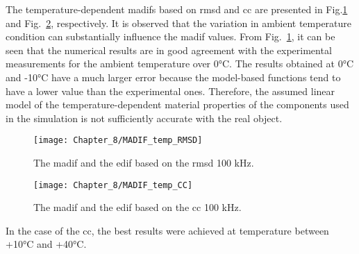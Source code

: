 The temperature-dependent \acp{madif} based on \ac{rmsd} and \ac{cc} are presented in Fig.\ref{fig:madif_temp_rmsd} and Fig.~\ref{fig:madif_temp_cc}, respectively.
It is observed that the variation in ambient temperature condition can substantially influence the \ac{madif} values.
From Fig.~\ref{fig:madif_temp_rmsd}, it can be seen that the numerical results are in good agreement with the experimental measurements for the ambient temperature over 0\unit{\degreeCelsius}.
The results obtained at 0\unit{\degreeCelsius} and -10\unit{\degreeCelsius} have a much larger error because the model-based functions tend to have a lower value than the experimental ones.
Therefore, the assumed linear model of the temperature-dependent material properties of the components used in the simulation is not sufficiently accurate with the real object.
\begin{figure}[!tbh]
	\begin{center}
		\texttt{[image: Chapter\_8/MADIF\_temp\_RMSD]}
	\end{center}
	\caption{The \acf{madif} and the \acf{edif} based on the \acf{rmsd} 100 \unit{\kHz}.}
	\label{fig:madif_temp_rmsd}
\end{figure}
\begin{figure}
	\begin{center}
		\texttt{[image: Chapter\_8/MADIF\_temp\_CC]}
	\end{center}
	\caption{The \acf{madif} and the \acf{edif} based on the \acf{cc} 100 \unit{\kHz}.}
	\label{fig:madif_temp_cc}
\end{figure}
In the case of the \ac{cc}, the best results were achieved at temperature between +10\unit{\degreeCelsius} and +40\unit{\degreeCelsius}. 
